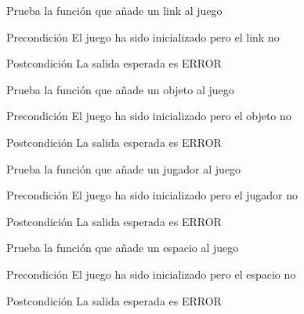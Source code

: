 \begin{DoxyRefList}
\item[\label{test__test000076}%
\hypertarget{test__test000076}{}%
Global \hyperlink{game__test_8c_af97f3fbab50d8122acc5b2632c9a27cb}{test3\-\_\-game\-\_\-add\-\_\-link} ()]Prueba la función que añade un link al juego \begin{DoxyPrecond}{Precondición}
El juego ha sido inicializado pero el link no 
\end{DoxyPrecond}
\begin{DoxyPostcond}{Postcondición}
La salida esperada es E\-R\-R\-O\-R  
\end{DoxyPostcond}

\item[\label{test__test000070}%
\hypertarget{test__test000070}{}%
Global \hyperlink{game__test_8c_ac6b7f7180414f14b0ca9629999da9f75}{test3\-\_\-game\-\_\-add\-\_\-object} ()]Prueba la función que añade un objeto al juego \begin{DoxyPrecond}{Precondición}
El juego ha sido inicializado pero el objeto no 
\end{DoxyPrecond}
\begin{DoxyPostcond}{Postcondición}
La salida esperada es E\-R\-R\-O\-R  
\end{DoxyPostcond}

\item[\label{test__test000079}%
\hypertarget{test__test000079}{}%
Global \hyperlink{game__test_8c_aae8f72a6c0030f8ecf6b27e8cc218d08}{test3\-\_\-game\-\_\-add\-\_\-player} ()]Prueba la función que añade un jugador al juego \begin{DoxyPrecond}{Precondición}
El juego ha sido inicializado pero el jugador no 
\end{DoxyPrecond}
\begin{DoxyPostcond}{Postcondición}
La salida esperada es E\-R\-R\-O\-R  
\end{DoxyPostcond}

\item[\label{test__test000073}%
\hypertarget{test__test000073}{}%
Global \hyperlink{game__test_8c_a7d77ce55d38ea58e076f160dc0ea019c}{test3\-\_\-game\-\_\-add\-\_\-space} ()]Prueba la función que añade un espacio al juego \begin{DoxyPrecond}{Precondición}
El juego ha sido inicializado pero el espacio no 
\end{DoxyPrecond}
\begin{DoxyPostcond}{Postcondición}
La salida esperada es E\-R\-R\-O\-R  
\end{DoxyPostcond}


\end{DoxyRefList}
